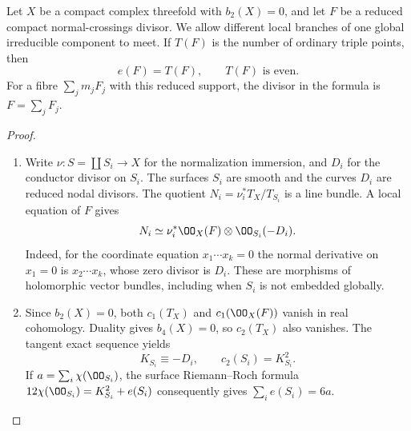 \begin{proposition}\hypertarget{tag-02XY}{}\label{night:P4.6}\label{stmt:P4.6}

Let $X$ be a compact complex threefold with $b_2(X)=0$, and let $F$ be a
reduced compact normal-crossings divisor. We allow different local
branches of one global irreducible component to meet. If $T(F)$ is the
number of ordinary triple points, then
\[
 e(F)=T(F),\qquad T(F)\text{ is even}.
\]
For a fibre $\sum_j m_jF_j$ with this reduced support, the divisor
in the formula is $F=\sum_jF_j$.
\end{proposition}
\begin{proof}

\begin{enumerate}[label={$\langle1\rangle$\arabic*.},leftmargin=*]
\item Write $\nu:S=\coprod S_i\to X$ for the normalization immersion, and $D_i$
for the conductor divisor on $S_i$. The surfaces $S_i$ are smooth and
the curves $D_i$ are reduced nodal divisors. The quotient
$N_i=\nu_i^*T_X/T_{S_i}$ is a line bundle. A local equation of $F$ gives
\[
 N_i\simeq \nu_i^*\OO_X(F)\otimes\OO_{S_i}(-D_i).
\]
Indeed, for the coordinate equation $x_1\cdots x_k=0$ the normal
derivative on $x_1=0$ is $x_2\cdots x_k$, whose zero divisor is $D_i$.
These are morphisms of holomorphic vector bundles, including when
$S_i$ is not embedded globally.

\item Since $b_2(X)=0$, both $c_1(T_X)$ and $c_1(\OO_X(F))$ vanish in real
cohomology. Duality gives $b_4(X)=0$, so $c_2(T_X)$ also vanishes. The
tangent exact sequence yields
\[
 K_{S_i}\equiv-D_i,\qquad c_2(S_i)=K_{S_i}^2.
\]
If $a=\sum_i\chi(\OO_{S_i})$, the surface Riemann--Roch formula
$12\chi(\OO_{S_i})=K_{S_i}^2+e(S_i)$ consequently gives
$\sum_i e(S_i)=6a$.


\end{enumerate}
\end{proof}
